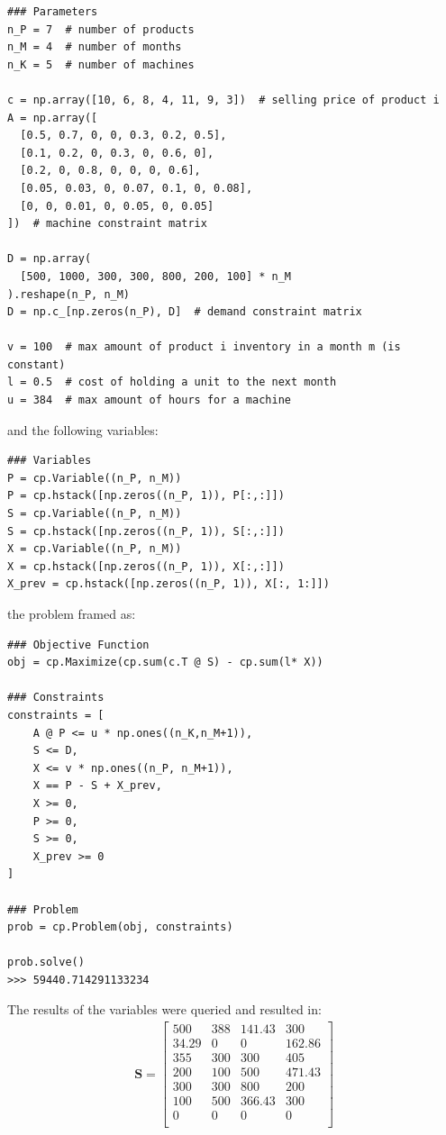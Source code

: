 \documentclass[11pt]{article}
\begin{document}
\begin{shaded}
\begin{verbatim}
### Parameters
n_P = 7  # number of products
n_M = 4  # number of months
n_K = 5  # number of machines

c = np.array([10, 6, 8, 4, 11, 9, 3])  # selling price of product i
A = np.array([
  [0.5, 0.7, 0, 0, 0.3, 0.2, 0.5],
  [0.1, 0.2, 0, 0.3, 0, 0.6, 0],
  [0.2, 0, 0.8, 0, 0, 0, 0.6],
  [0.05, 0.03, 0, 0.07, 0.1, 0, 0.08],
  [0, 0, 0.01, 0, 0.05, 0, 0.05]
])  # machine constraint matrix

D = np.array(
  [500, 1000, 300, 300, 800, 200, 100] * n_M
).reshape(n_P, n_M)
D = np.c_[np.zeros(n_P), D]  # demand constraint matrix

v = 100  # max amount of product i inventory in a month m (is constant)
l = 0.5  # cost of holding a unit to the next month
u = 384  # max amount of hours for a machine
\end{verbatim}
\end{shaded}
and the following variables:
\begin{shaded}
\begin{verbatim}
### Variables
P = cp.Variable((n_P, n_M))
P = cp.hstack([np.zeros((n_P, 1)), P[:,:]]) 
S = cp.Variable((n_P, n_M))
S = cp.hstack([np.zeros((n_P, 1)), S[:,:]]) 
X = cp.Variable((n_P, n_M))
X = cp.hstack([np.zeros((n_P, 1)), X[:,:]]) 
X_prev = cp.hstack([np.zeros((n_P, 1)), X[:, 1:]])
\end{verbatim}
\end{shaded}
the problem framed as:
\begin{shaded}
\begin{verbatim}
### Objective Function
obj = cp.Maximize(cp.sum(c.T @ S) - cp.sum(l* X))

### Constraints
constraints = [
    A @ P <= u * np.ones((n_K,n_M+1)),
    S <= D,
    X <= v * np.ones((n_P, n_M+1)),
    X == P - S + X_prev,
    X >= 0,
    P >= 0,
    S >= 0,
    X_prev >= 0
]

### Problem
prob = cp.Problem(obj, constraints)

prob.solve()
>>> 59440.714291133234
\end{verbatim}
\end{shaded}

The results of the variables were queried and resulted in:
\begin{align*}
  \textbf{S} = 
  \begin{bmatrix}
  500 & 388 & 141.43 & 300 \\
  34.29 & 0 & 0 & 162.86 \\
  355 & 300 & 300 & 405 \\
  200 & 100 & 500 & 471.43 \\
  300 & 300 & 800 & 200 \\
  100 & 500 & 366.43 & 300 \\
  0 & 0 & 0 & 0 \\
  \end{bmatrix}
  \end{align*}
  
\end{document}
